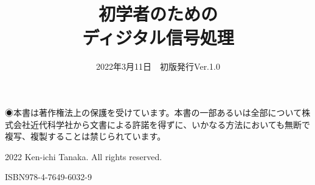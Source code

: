 \backmatter
\begin{colophon}
\title{初学者のための\\ディジタル信号処理}
\date{2022年3月11日　初版発行Ver.1.0}
\begin{dlist}

\end{dlist}
\begin{notice}◉本書は著作権法上の保護を受けています。本書の一部あるいは全部について株式会社近代科学社から文書による許諾を得ずに、いかなる方法においても無断で複写、複製することは禁じられています。\end{notice}
\begin{copyright}{\textcopyright}2022 Ken-ichi Tanaka. All rights reserved.\end{copyright}
\begin{isbncode}ISBN978-4-7649-6032-9\end{isbncode}



\end{colophon}

